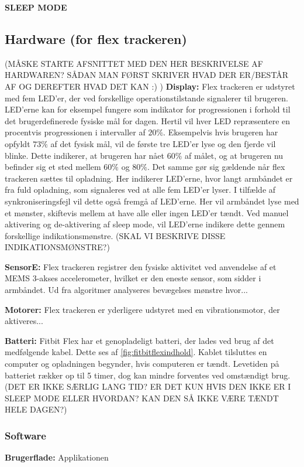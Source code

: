 \textbf{SLEEP MODE}


\subsection{Hardware (for flex trackeren)}
(MÅSKE STARTE AFSNITTET MED DEN HER BESKRIVELSE AF HARDWAREN? SÅDAN MAN FØRST SKRIVER HVAD DER ER/BESTÅR AF OG DEREFTER HVAD DET KAN :) )
\textbf{Display:} 
Flex trackeren er udstyret med fem LED'er, der ved forskellige operationstilstande signalerer til brugeren. 
LED'erne kan for eksempel fungere som indikator for progressionen i forhold til det brugerdefinerede fysiske mål for dagen. Hertil vil hver LED repræsentere en procentvis progressionen i intervaller af $20 \%$. Eksempelvis hvis brugeren har opfyldt $73 \%$ af det fysisk mål, vil de første tre LED'er lyse og den fjerde vil blinke. Dette indikerer, at brugeren har nået $60 \%$ af målet, og at brugeren nu befinder sig et sted mellem $60 \%$ og $80 \%$. 
Det samme gør sig gældende når flex trackeren sættes til opladning. Her indikerer LED'erne, hvor langt armbåndet er fra fuld opladning, som signaleres ved at alle fem LED'er lyser. 
I tilfælde af synkroniseringsfejl vil dette også fremgå af LED'erne. Her vil armbåndet lyse med et mønster, skiftevis mellem at have alle eller ingen LED'er tændt. 
Ved manuel aktivering og de-aktivering af sleep mode, vil LED'erne indikere dette gennem forskellige indikationsmønstre. (SKAL VI BESKRIVE DISSE INDIKATIONSMØNSTRE?)

\textbf{SensorE:} 
Flex trackeren registrer den fysiske aktivitet ved anvendelse af et MEMS 3-akses accelerometer, hvilket er den eneste sensor, som sidder i armbåndet. Ud fra algoritmer analyseres bevægelses mønstre hvor...


\textbf{Motorer:}
Flex trackeren er yderligere udstyret med en vibrationsmotor, der aktiveres... 


\textbf{Batteri:} 
Fitbit Flex har et genopladeligt batteri, der lades ved brug af det medfølgende kabel. Dette ses af \autoref{fig:fitbitflexindhold}. Kablet tilsluttes en computer og opladningen begynder, hvis computeren er tændt. 
Levetiden på batteriet rækker op til 5 timer, dog kan mindre forventes ved omstændigt brug. (DET ER IKKE SÆRLIG LANG TID? ER DET KUN HVIS DEN IKKE ER I SLEEP MODE ELLER HVORDAN? KAN DEN SÅ IKKE VÆRE TÆNDT HELE DAGEN?)


\subsubsection{Software}
\textbf{Brugerflade:} %
Applikationen  

